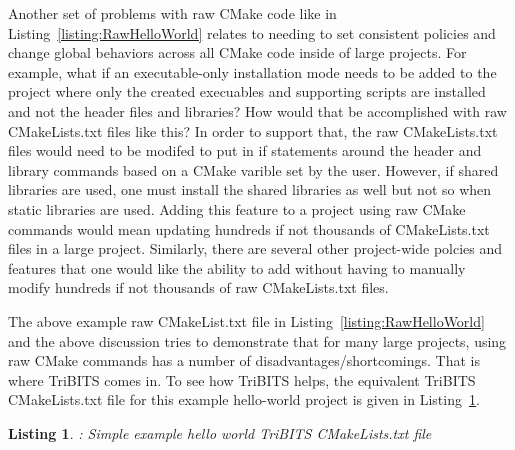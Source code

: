 \documentclass[10pt]{article}
\newtheorem{listing}{Listing}
\begin{document}
Another set of problems with raw CMake code like in Listing~\ref{listing:RawHelloWorld} relates to needing to set consistent policies and change global behaviors across all CMake code inside of large projects.  For example, what if an executable-only installation mode needs to be added to the project where only the created execuables and supporting scripts are installed and not the header files and libraries?  How would that be accomplished with raw CMakeLists.txt files like this?  In order to support that, the raw CMakeLists.txt files would need to be modifed to put in if statements around the header and library  commands based on a CMake varible set by the user.  However, if shared libraries are used, one must install the shared libraries as well but not so when static libraries are used.  Adding this feature to a project using raw CMake commands would mean updating hundreds if not thousands of CMakeLists.txt files in a large project.  Similarly, there are several other project-wide polcies and features that one would like the ability to add without having to manually modify hundreds if not thousands of raw CMakeLists.txt files.

The above example raw CMakeList.txt file in Listing~\ref{listing:RawHelloWorld} and the above discussion tries to demonstrate that for many large projects, using raw CMake commands has a number of disadvantages/shortcomings.  That is where TriBITS comes in.  To see how TriBITS helps, the equivalent TriBITS CMakeLists.txt file for this example hello-world project is given in Listing~\ref{listing:TribitsHelloWorld}.

\begin{listing}: Simple example hello world TriBITS CMakeLists.txt file
\label{listing:TribitsHelloWorld}
{\small

}
\end{listing}
\end{document}
